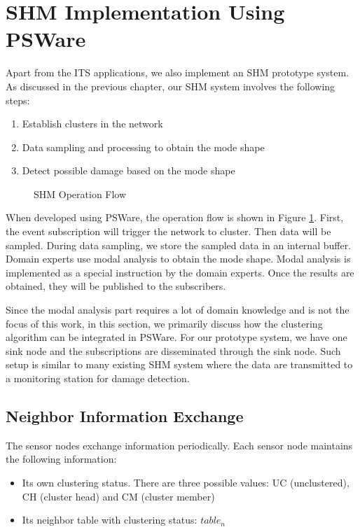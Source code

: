 \section{SHM Implementation Using PSWare}
Apart from the ITS applications, we also implement an SHM prototype system. As discussed in the previous chapter, our SHM system involves the following steps:
\begin{enumerate}
\item Establish clusters in the network
\item Data sampling and processing to obtain the mode shape
\item Detect possible damage based on the mode shape
\end{enumerate}

\begin{figure}
\centering
{}
\caption{SHM Operation Flow}
\label{fig:shm-flow}
\end{figure}

When developed using PSWare, the operation flow is shown in Figure \ref{fig:shm-flow}. First, the event subscription will trigger the network to cluster. Then data will be sampled. During data sampling, we store the sampled data in an internal buffer. Domain experts use modal analysis to obtain the mode shape. Modal analysis is implemented as a special instruction by the domain experts. Once the results are obtained, they will be published to the subscribers.

Since the modal analysis part requires a lot of domain knowledge and is not the focus of this work, in this section, we primarily discuss how the clustering algorithm can be integrated in PSWare. For our prototype system, we have one sink node and the subscriptions are disseminated through the sink node. Such setup is similar to many existing SHM system where the data are transmitted to a monitoring station for damage detection.

\subsection{Neighbor Information Exchange}
The sensor nodes exchange information periodically. Each sensor node maintains the following information:
\begin{itemize}
\item Its own clustering status. There are three possible values: UC (unclustered), CH (cluster head) and CM (cluster member)
\item Its neighbor table with clustering status: \(table_n\)
\end{itemize}


